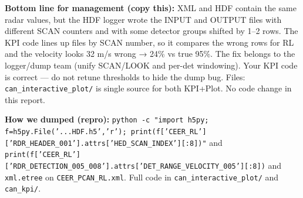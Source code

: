 \documentclass[11pt,a4paper]{article}
\begin{document}
\begin{tcolorbox}[colback=lightGray,colframe=midGray,arc=2mm,boxsep=2mm]
\scriptsize
\textbf{Bottom line for management (copy this):} XML and HDF contain the same radar values, but the HDF logger wrote the INPUT and OUTPUT files with different SCAN counters and with some detector groups shifted by 1–2 rows. The KPI code lines up files by SCAN number, so it compares the wrong rows for RL and the velocity looks 32 m/s wrong → 24\% vs true 95\%. The fix belongs to the logger/dump team (unify SCAN/LOOK and per-det windowing). Your KPI code is correct — do not retune thresholds to hide the dump bug.
\hfill \textcolor{midGray}{Files: \texttt{can\_interactive\_plot/} is single source for both KPI+Plot. No code change in this report.}
\end{tcolorbox}

\vspace{1mm}
\textcolor{midGray}{\scriptsize \textbf{How we dumped (repro):} \texttt{python -c "import h5py; f=h5py.File('...HDF.h5','r'); print(f['CEER\_RL']['RDR\_HEADER\_001'].attrs['HED\_SCAN\_INDEX'][:8])"} and \texttt{print(f['CEER\_RL']['RDR\_DETECTION\_005\_008'].attrs['DET\_RANGE\_VELOCITY\_005'][:8])} and \texttt{xml.etree} on \texttt{CEER\_PCAN\_RL.xml}. Full code in \texttt{can\_interactive\_plot/} and \texttt{can\_kpi/}.}
\end{document}

